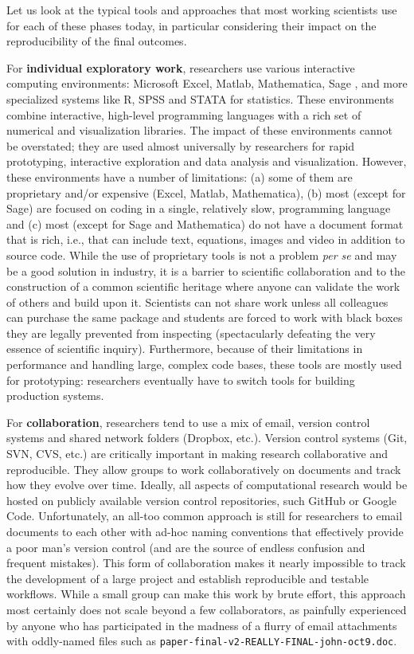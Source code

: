 \documentclass[ChapterTOCs,krantz2]{krantz} %
\begin{document}
Let us look at the typical tools and approaches that most working scientists
use for each of these phases today, in particular considering their impact on
the reproducibility of the final outcomes. 

For \textbf{individual exploratory work}, researchers use various interactive
computing environments: Microsoft Excel, Matlab, Mathematica, Sage \cite{sage},
and more specialized systems like R, SPSS and STATA for statistics. These
environments combine interactive, high-level programming languages with a rich
set of numerical and visualization libraries. The impact of these environments
cannot be overstated; they are used almost universally by researchers for rapid
prototyping, interactive exploration and data analysis and
visualization. However, these environments have a number of limitations: (a)
some of them are proprietary and/or expensive (Excel, Matlab, Mathematica), (b)
most (except for Sage) are focused on coding in a single, relatively slow,
programming language and (c) most (except for Sage and Mathematica) do not have
a document format that is rich, i.e., that can include text, equations, images
and video in addition to source code. While the use of proprietary tools is not
a problem \emph{per se} and may be a good solution in industry, it is a barrier
to scientific collaboration and to the construction of a common scientific
heritage where anyone can validate the work of others and build upon it.
Scientists can not share work unless all colleagues can purchase the same package
and students are forced to work with black boxes they are legally prevented
from inspecting (spectacularly defeating the very essence of scientific
inquiry). Furthermore, because of their limitations in performance and handling
large, complex code bases, these tools are mostly used for prototyping:
researchers eventually have to switch tools for building production systems.

For \textbf{collaboration}, researchers tend to use a mix of email, version
control systems and shared network folders (Dropbox, etc.).  Version control
systems (Git, SVN, CVS, etc.) are critically important in making research
collaborative and reproducible. They allow groups to work collaboratively on
documents and track how they evolve over time. Ideally, all aspects of
computational research would be hosted on publicly available version control
repositories, such GitHub or Google Code. Unfortunately, an all-too common
approach is still for researchers to email documents to each other with ad-hoc
naming conventions that effectively provide a poor man's version control (and
are the source of endless confusion and frequent mistakes). This form of
collaboration makes it nearly impossible to track the development of a large
project and establish reproducible and testable workflows.  While a small group
can make this work by brute effort, this approach most certainly does not scale
beyond a few collaborators, as painfully experienced by anyone who has
participated in the madness of a flurry of email attachments with oddly-named
files such as {\tt paper-final-v2-REALLY-FINAL-john-oct9.doc}.
\end{document}
